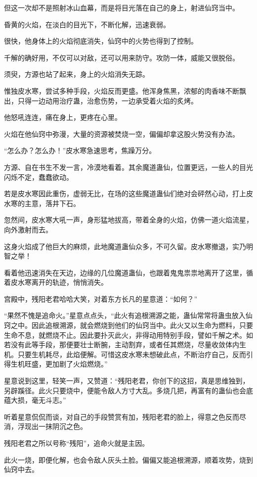 \begin{this_body}
但这一次却不是照射冰山血幕，而是将目光落在自己的身上，射进仙窍当中。

昏黄的火焰，在淡白的目光下，不断化解，迅速衰弱。

很快，他身体上的火焰彻底消失，仙窍中的火势也得到了控制。

千解的确好用，不仅可以对敌，还可以用来防守。攻防一体，威能又很脱俗。

须臾，方源也站了起来，身上的火焰消失无踪。

惟独皮水寒，尝试多种手段，火焰反而更盛。他浑身焦黑，浓郁的肉香味不断飘出，只得一边动用治疗蛊，治愈伤势，一边承受着火焰的炙烤。

他怒吼连连，痛在身上，更疼在心里。

火焰在他仙窍中弥漫，大量的资源被焚烧一空，偏偏却拿这股火势没有办法。

“怎么办？怎么办！”皮水寒急速思考，焦躁万分。

方源、自在书生不发一言，冷漠地看着。其余魔道蛊仙，位置更远，一些人的目光闪烁不定，蠢蠢欲动。

若是皮水寒因此重伤，虚弱无比，在场的这些魔道蛊仙们绝对会砰然心动，打上皮水寒的主意，落井下石。

忽然间，皮水寒大吼一声，身形猛地拔高，带着全身的火焰，仿佛一道火焰流星，向外激射而去。

这身火焰成了他巨大的麻烦，此地魔道蛊仙众多，不可久留。皮水寒撤退，实乃明智之举！

看着他迅速消失在天边，边缘的几位魔道蛊仙，也跟着鬼鬼祟祟地离开了这里，循着皮水寒离开的轨迹，悄悄消失。

宫殿中，残阳老君哈哈大笑，对着东方长凡的星意道：“如何？”

“果然不愧是追命火。”星意点点头，“此火有追根溯源之能，蛊仙常常将蛊虫放入仙窍之中。因此追根溯源，就会燃烧到他们的仙窍当中。此火又以生命为燃料，只要生命不息，就燃烧不止。因此要扑灭此火，非得动用特别手段，譬如千解之术。如若没有此等手段，那便要壮士断腕，主动割弃，或者任其燃烧，尽量收敛体内生机。只要生机耗尽，此焰便解。可惜这皮水寒未想破此点，不断治疗自己，反而引得生机旺盛，更加剧了火焰燃烧。”

星意说到这里，轻笑一声，又赞道：“残阳老君，你创下的这招，真是思维独到，另辟蹊径。此火只要烧中，便能令敌人方寸大乱。多烧几把，再富有的蛊仙也会底蕴大损，毫无斗志。”

听着星意侃侃而谈，对自己的手段赞赏有加，残阳老君的脸上，得意之色反而尽消，浮现出一抹阴沉之色。

残阳老君之所以号称“残阳”，追命火就是主因。

此火一烧，即便化解，也会令敌人灰头土脸。偏偏又能追根溯源，顺着攻势，烧到仙窍中去。


\end{this_body}
